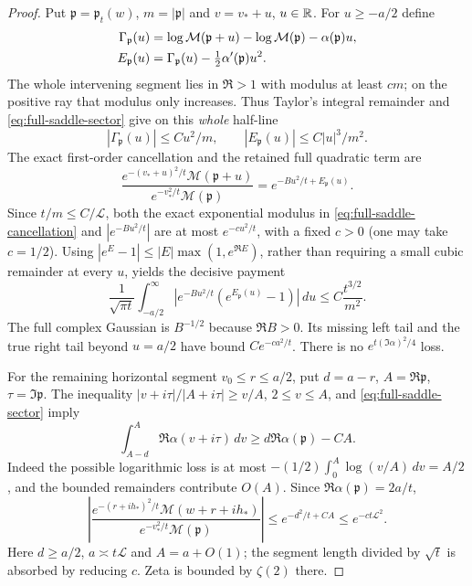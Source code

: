 \begin{proof}
Put $\mathfrak p=\mathfrak p_t(w)$, $m=|\mathfrak p|$ and
$v=v_*+u$, $u\in\mathbb R$. For $u\ge-a/2$ define
\begin{align}
 \Gamma_{\mathfrak p}(u)
 &=\log\mathcal M(\mathfrak p+u)-\log\mathcal M(\mathfrak p)
                                       -\alpha(\mathfrak p)u,\notag\\
 E_{\mathfrak p}(u)&=\Gamma_{\mathfrak p}(u)
                              -\tfrac12\alpha'(\mathfrak p)u^2.
 \label{eq:full-saddle-remainders}
\end{align}
The whole intervening segment lies in $\Re>1$ with modulus at least
$cm$; on the positive ray that modulus only increases. Thus Taylor's
integral remainder and \eqref{eq:full-saddle-sector} give on this
\emph{whole} half-line
\[
 |\Gamma_{\mathfrak p}(u)|\le Cu^2/m,
 \qquad |E_{\mathfrak p}(u)|\le C|u|^3/m^2.
\]
The exact first-order cancellation and the retained full quadratic term
are
\begin{equation}
 \frac{e^{-(v_*+u)^2/t}\mathcal M(\mathfrak p+u)}
      {e^{-v_*^2/t}\mathcal M(\mathfrak p)}
       =e^{-Bu^2/t+E_{\mathfrak p}(u)}.
 \label{eq:full-saddle-cancellation}
\end{equation}
Since $t/m\le C/\mathcal L$, both the exact exponential modulus in
\eqref{eq:full-saddle-cancellation} and $|e^{-Bu^2/t}|$ are at most
$e^{-cu^2/t}$, with a fixed $c>0$ (one may take $c=1/2$).
Using $|e^E-1|\le|E|\max(1,e^{\Re E})$, rather than requiring a
small cubic remainder at every $u$, yields the decisive payment
\begin{equation}
 \frac1{\sqrt{\pi t}}\int_{-a/2}^\infty
  |e^{-Bu^2/t}(e^{E_{\mathfrak p}(u)}-1)|\,du
 \le C\frac{t^{3/2}}{m^2}.
 \label{eq:full-saddle-cubic-payment}
\end{equation}
The full complex Gaussian is $B^{-1/2}$ because $\Re B>0$.
Its missing left tail and the true right tail beyond $u=a/2$ have
bound $Ce^{-ca^2/t}$. There is no $e^{t(\Im\alpha)^2/4}$ loss.

For the remaining horizontal segment $v_0\le r\le a/2$, put
$d=a-r$, $A=\Re\mathfrak p$, $\tau=\Im\mathfrak p$.
The inequality $|v+i\tau|/|A+i\tau|\ge v/A$, $2\le v\le A$,
and \eqref{eq:full-saddle-sector} imply
\begin{equation}
 \int_{A-d}^A\Re\alpha(v+i\tau)\,dv
 \ge d\Re\alpha(\mathfrak p)-CA.
 \label{eq:full-saddle-left-integral}
\end{equation}
Indeed the possible logarithmic loss is at most
$-(1/2)\int_0^A\log(v/A)\,dv=A/2$, and the bounded remainders
contribute $O(A)$. Since $\Re\alpha(\mathfrak p)=2a/t$,
\begin{equation}
 \left|\frac{e^{-(r+ih_*)^2/t}\mathcal M(w+r+ih_*)}
 {e^{-v_*^2/t}\mathcal M(\mathfrak p)}\right|
 \le e^{-d^2/t+CA}\le e^{-ct\mathcal L^2}.
 \label{eq:full-saddle-left-payment}
\end{equation}
Here $d\ge a/2$, $a\asymp t\mathcal L$ and $A=a+O(1)$;
the segment length divided by $\sqrt t$ is absorbed by reducing $c$.
Zeta is bounded by $\zeta(2)$ there.


\end{proof}
